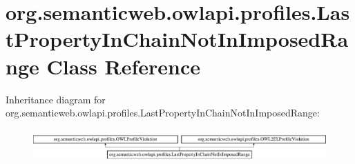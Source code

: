 \hypertarget{classorg_1_1semanticweb_1_1owlapi_1_1profiles_1_1_last_property_in_chain_not_in_imposed_range}{\section{org.\-semanticweb.\-owlapi.\-profiles.\-Last\-Property\-In\-Chain\-Not\-In\-Imposed\-Range Class Reference}
\label{classorg_1_1semanticweb_1_1owlapi_1_1profiles_1_1_last_property_in_chain_not_in_imposed_range}
}
Inheritance diagram for org.\-semanticweb.\-owlapi.\-profiles.\-Last\-Property\-In\-Chain\-Not\-In\-Imposed\-Range\-:\begin{figure}[H]
\begin{center}
\leavevmode
\includegraphics[height=1.299304cm]{classorg_1_1semanticweb_1_1owlapi_1_1profiles_1_1_last_property_in_chain_not_in_imposed_range}
\end{center}
\end{figure}

